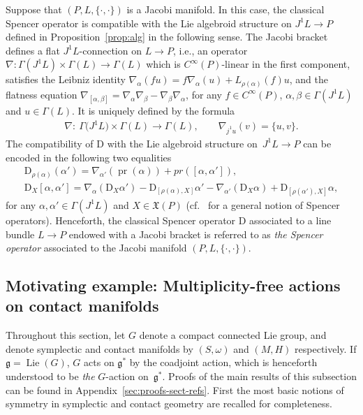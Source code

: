 \documentclass[10pt,a4paper]{amsart}
\numberwithin{equation}{section}
\newcommand{\X}{\ensuremath{\mathfrak{X}}}
\newcommand{\pr}{\operatorname{pr}}
\newcommand{\CM}{(M,H)} %
\newcommand{\SM}{(S,\omega)} %
\begin{document}
Suppose that $(P, L ,\{\cdot, \cdot\})$ is a Jacobi manifold. In this case, the classical Spencer operator is compatible with the Lie algebroid structure on $J^1L \to P$ def\/ined in Proposition~\ref{prop:alg} in the following sense. The Jacobi bracket def\/ines a f\/lat $J^1L$-connection on $L \to P$, i.e., an operator $\nabla\colon \Gamma(J^1L)\times\Gamma(L)\to \Gamma(L)$ which is $C^\infty(P)$-linear in the f\/irst component, satisf\/ies the Leibniz identity $\nabla_\alpha(fu)=f\nabla_\alpha(u)+L_{\rho(\alpha)}(f)u$, and the f\/latness equation $\nabla_{[\alpha,\beta]}=\nabla_\alpha\nabla_\beta-\nabla_\beta\nabla_\alpha$, for any $f \in C^{\infty}(P)$, $\alpha,\beta \in \Gamma(J^1L)$
and $u \in \Gamma(L)$. It is uniquely def\/ined by the formula
\begin{gather}\label{eq:nabla}
 \nabla\colon \ \Gamma\big(J^1L\big)\times\Gamma(L)\to\Gamma(L),\qquad \nabla_{j^1u}(v)= \{u,v\}.
\end{gather}
The compatibility of $\mathrm{D}$ with the Lie algebroid structure on~$J^1L \to P$ can be encoded in the following two equalities
\begin{gather}
 \label{horizontal}\mathrm{D}_{\rho(\alpha)}(\alpha') =\nabla_{\alpha'}(\pr(\alpha))+ pr([\alpha, \alpha']), \\
 \label{vertical} \mathrm{D}_X[\alpha,\alpha']=\nabla_\alpha(\mathrm{D}_X\alpha')- \mathrm{D}_{[\rho(\alpha),X]}\alpha'-\nabla_{\alpha'}(\mathrm{D}_X\alpha)+\mathrm{D}_{[\rho(\alpha'),X]}\alpha,
\end{gather}
for any $\alpha,\alpha'\in\Gamma(J^1L)$ and $X \in \X(P)$ (cf.~\cite{Maria} for a general notion of Spencer operators). Henceforth, the classical Spencer operator $\mathrm{D}$ associated to a line bundle $L \to P$ endowed with a Jacobi bracket is referred to as {\it the Spencer operator}
associated to the Jacobi manifold $(P,L,\{\cdot,\cdot\})$.

\subsection{Motivating example: Multiplicity-free actions on contact manifolds}\label{sec:motiv-famil-exampl}

Throughout this section, let $G$ denote a compact connected Lie group, and denote symplectic and contact manifolds by $\SM$ and $\CM$ respectively. If $\mathfrak{g} = \operatorname{Lie}(G)$, $G$ acts on $\mathfrak{g}^*$ by the coadjoint action, which is henceforth understood to be {\em the} $G$-action on~$\mathfrak{g}^*$. Proofs of the main results of this subsection can be found in Appendix~\ref{sec:proofs-sect-refs}. First the most basic notions of symmetry in symplectic and contact geometry are recalled for completeness.
\end{document}

